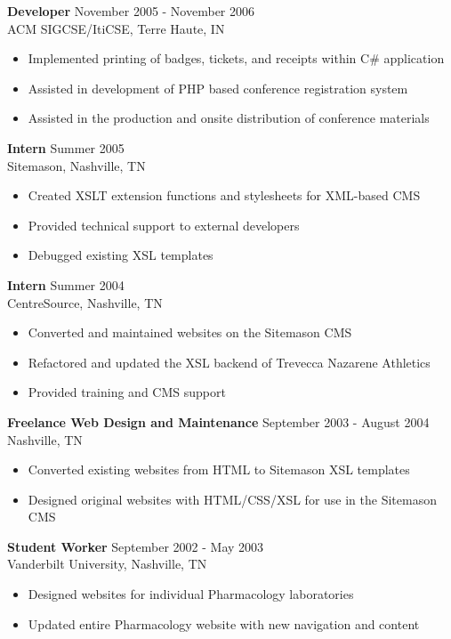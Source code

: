 \documentclass[line, margin, 10pt]{res}
\begin{document}
\begin{resume}
{\bf Developer} \hfill November 2005 - November 2006\\
ACM SIGCSE/ItiCSE, Terre Haute, IN
\begin{itemize} \itemsep -2pt
\item Implemented printing of badges, tickets, and receipts within C\# application
\item Assisted in development of PHP based conference registration system
\item Assisted in the production and onsite distribution of conference materials
\end{itemize}

{\bf Intern} \hfill Summer 2005\\
Sitemason, Nashville, TN
\begin{itemize} \itemsep -2pt
\item Created XSLT extension functions and stylesheets for XML-based CMS
\item Provided technical support to external developers
\item Debugged existing XSL templates
\end{itemize}

{\bf Intern} \hfill Summer 2004\\
CentreSource, Nashville, TN
\begin{itemize} \itemsep -2pt
\item Converted and maintained websites on the Sitemason CMS
\item Refactored and updated the XSL backend of Trevecca Nazarene Athletics
\item Provided training and CMS support
\end{itemize}

{\bf Freelance Web Design and Maintenance} \hfill September 2003 - August 2004\\
Nashville, TN
\begin{itemize} \itemsep -2pt
\item Converted existing websites from HTML to Sitemason XSL templates
\item Designed original websites with HTML/CSS/XSL for use in the Sitemason CMS
\end{itemize}

{\bf Student Worker} \hfill September 2002 - May 2003\\
Vanderbilt University, Nashville, TN
\begin{itemize} \itemsep -2pt
\item Designed websites for individual Pharmacology laboratories
\item Updated entire Pharmacology website with new navigation and content
\end{itemize}



\end{resume}
\end{document}
